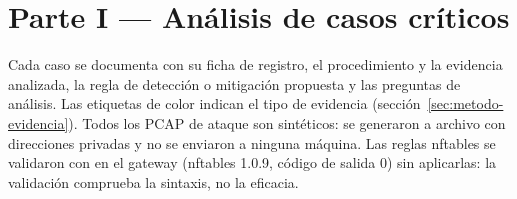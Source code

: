 \chapter{Parte I — Análisis de casos críticos}\label{cap:parte1}
Cada caso se documenta con su ficha de registro, el procedimiento y la evidencia analizada, la regla de detección o mitigación propuesta y las preguntas de análisis. Las etiquetas de color indican el tipo de evidencia (sección~\ref{sec:metodo-evidencia}). Todos los PCAP de ataque son sintéticos: se generaron a archivo con direcciones privadas y no se enviaron a ninguna máquina. Las reglas nftables se validaron con  en el gateway (nftables 1.0.9, código de salida 0) sin aplicarlas: la validación comprueba la sintaxis, no la eficacia.



